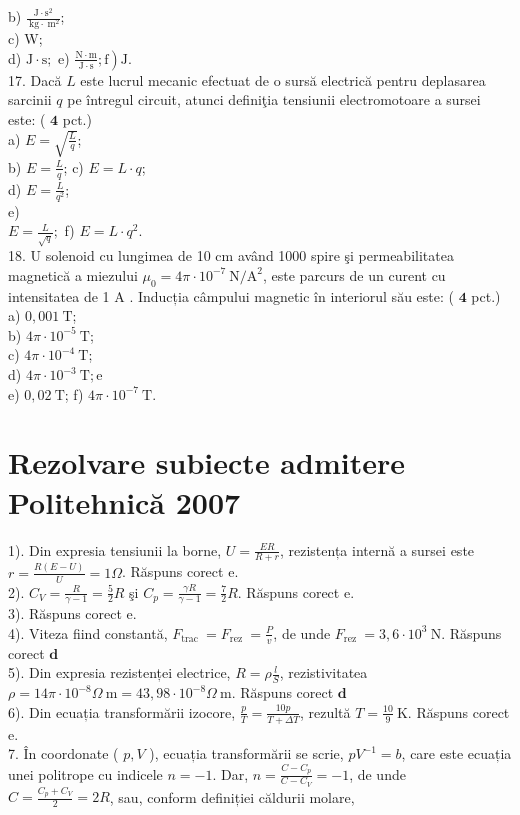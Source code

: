 b) $\frac{\mathrm{J} \cdot \mathrm{s}^{2}}{\mathrm{~kg} \cdot \mathrm{~m}^{2}}$;\\
c) W;\\
d) $\mathrm{J} \cdot \mathrm{s} ;$ e) $\left.\frac{\mathrm{N} \cdot \mathrm{m}}{\mathrm{J} \cdot \mathrm{s}} ; \mathrm{f}\right) \mathrm{J}$.\\
17. Dacă $L$ este lucrul mecanic efectuat de o sursă electrică pentru deplasarea sarcinii $q$ pe întregul circuit, atunci definiţia tensiunii electromotoare a sursei este: ( $\mathbf{4}$ pct.)\\
a) $E=\sqrt{\frac{L}{q}}$;\\
b) $E=\frac{L}{q}$; c) $E=L \cdot q$;\\
d) $E=\frac{L}{q^{2}}$;\\
e)\\
$E=\frac{L}{\sqrt{q}} ;$ f) $E=L \cdot q^{2}$.\\
18. U solenoid cu lungimea de 10 cm având 1000 spire şi permeabilitatea magnetică a miezului $\mu_{0}=4 \pi \cdot 10^{-7} \mathrm{~N} / \mathrm{A}^{2}$, este parcurs de un curent cu intensitatea de 1 A . Inducția câmpului magnetic în interiorul său este: ( $\mathbf{4}$ pct.)\\
a) $0,001 \mathrm{~T}$;\\
b) $4 \pi \cdot 10^{-5} \mathrm{~T}$;\\
c) $4 \pi \cdot 10^{-4} \mathrm{~T}$;\\
d) $4 \pi \cdot 10^{-3} \mathrm{~T} ; \mathrm{e}$\\
e) $0,02 \mathrm{~T}$; f) $4 \pi \cdot 10^{-7} \mathrm{~T}$.

\section*{Rezolvare subiecte admitere Politehnică 2007}
1). Din expresia tensiunii la borne, $U=\frac{E R}{R+r}$, rezistența internă a sursei este $r=\frac{R(E-U)}{U}=1 \Omega$. Răspuns corect e.\\
2). $C_{V}=\frac{R}{\gamma-1}=\frac{5}{2} R$ şi $C_{p}=\frac{\gamma R}{\gamma-1}=\frac{7}{2} R$. Răspuns corect e.\\
3). Răspuns corect e.\\
4). Viteza fiind constantă, $F_{\text {trac }}=F_{\text {rez }}=\frac{P}{v}$, de unde $F_{\text {rez }}=3,6 \cdot 10^{3} \mathrm{~N}$. Răspuns corect $\boldsymbol{d}$\\
5). Din expresia rezistenței electrice, $R=\rho \frac{l}{S}$, rezistivitatea $\rho=14 \pi \cdot 10^{-8} \Omega \mathrm{~m}=43,98 \cdot 10^{-8} \Omega \mathrm{~m}$. Răspuns corect $\boldsymbol{d}$\\
6). Din ecuația transformării izocore, $\frac{p}{T}=\frac{10 p}{T+\Delta T}$, rezultă $T=\frac{10}{9} \mathrm{~K}$. Răspuns corect e.\\
7. În coordonate ( $p, V$ ), ecuația transformării se scrie, $p V^{-1}=b$, care este ecuația unei politrope cu indicele $n=-1$. Dar, $n=\frac{C-C_{p}}{C-C_{V}}=-1$, de unde $C=\frac{C_{p}+C_{V}}{2}=2 R$, sau, conform definiției căldurii molare,


